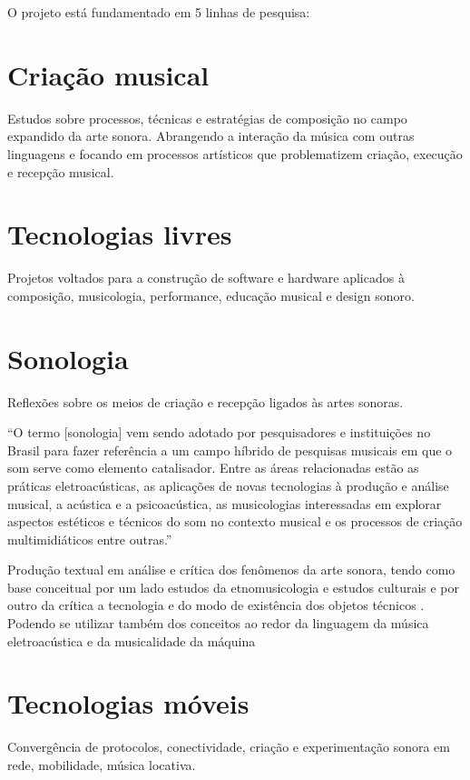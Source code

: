 \documentclass[
	12pt,				%
	openright,			%
	twoside,			%
	a4paper,			%
	english,			%
	french,				%
	spanish,			%
	brazil,				%
	]{abntex2}
\begin{document}
O projeto está fundamentado em 5 linhas de pesquisa:

\section{Criação musical}

Estudos sobre processos, técnicas e estratégias de composição no campo expandido da arte sonora. Abrangendo a interação da música com outras linguagens e focando em processos artísticos que problematizem criação, execução e recepção musical.

\section{Tecnologias livres}

Projetos voltados para a construção de software e hardware aplicados à composição, musicologia, performance, educação musical e design sonoro.

\section{Sonologia}

Reflexões sobre  os meios de criação e recepção ligados às artes sonoras.

“O termo [sonologia] vem sendo adotado por pesquisadores e instituições no Brasil para fazer referência a um campo híbrido de pesquisas musicais em que o som serve como elemento catalisador. Entre as áreas relacionadas estão as práticas eletroacústicas, as aplicações de novas tecnologias à produção e análise musical, a acústica e a psicoacústica, as musicologias interessadas em explorar aspectos estéticos e técnicos do som no contexto musical e os processos de criação multimidiáticos entre outras.”

Produção textual em análise e crítica dos fenômenos da arte sonora, tendo como base conceitual por um lado estudos da etnomusicologia e estudos culturais e por outro da crítica a tecnologia e do modo de existência dos objetos técnicos \cite{simondon2008modo} . Podendo se utilizar  também dos conceitos ao redor da linguagem da música eletroacústica \cite{emmerson1986language} e da musicalidade da máquina\cite{rowe2004machine}

\section{Tecnologias móveis}

Convergência de protocolos, conectividade, criação e experimentação sonora em rede, mobilidade, música locativa.
\end{document}
